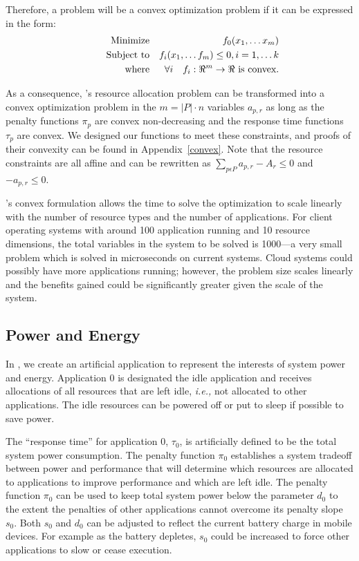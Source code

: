 Therefore, a problem will be a convex optimization problem if it can be expressed in the form:
\begin{eqnarray*}
& \makebox[1in][r]{Minimize}   & f_0(x_1,\ldots x_m)                              \\
& \makebox[1in][r]{Subject to} & f_i(x_1,\ldots f_m) \leq 0, i = 1,\ldots k        \\
& \makebox[1in][r]{where}      & \forall i \quad f_i:\Re^m \rightarrow \Re \mbox{ is convex.}
\end{eqnarray*}


As a consequence, \pacora's resource allocation problem can be transformed into a convex optimization problem in the $m = |P|\cdot n$ variables $a_{p,r}$ as long as the penalty functions $\pi_p$ are convex non-decreasing and the response time functions $\tau_p$ are convex.  We designed our functions to meet these constraints, and proofs of their convexity can be found in Appendix~\ref{convex}. Note that the resource constraints are all affine and can be rewritten as
$\sum_{p\epsilon P} a_{p,r} - A_r \leq 0$ and $-a_{p,r} \leq 0$.

\pacora's convex formulation allows the time to solve the optimization to scale linearly with the number of resource types and the number of applications.   For client operating systems with around 100 application running and 10 resource dimensions, the total variables in the system to be solved is 1000---a very small problem which is solved in microseconds on current systems.  Cloud systems could possibly have more applications running; however, the problem size scales linearly and the benefits gained could be significantly greater given the scale of the system.

\subsection*{Power and Energy}
In \pacora, we create an artificial application to represent the interests of system power and energy.  Application 0 is designated the idle application and receives allocations of all resources
that are left idle, \emph{i.e.,} not allocated to other applications.   The idle resources can be powered off or put to sleep if possible to save power.

The ``response time'' for application 0, $\tau_0$, is artificially defined to be the total system power consumption.
The penalty function $\pi_0$ establishes a system tradeoff between power and performance that
will determine which resources are allocated to applications to improve performance and which are left idle.
The penalty function $\pi_0$ can be used to keep total system power below the parameter $d_0$
to the extent the penalties of other applications cannot overcome its penalty slope $s_0$. Both $s_0$ and $d_0$ can be adjusted to reflect the current battery charge in mobile devices. For example as the battery depletes, $s_0$ could be increased to force other applications to slow or cease execution.

